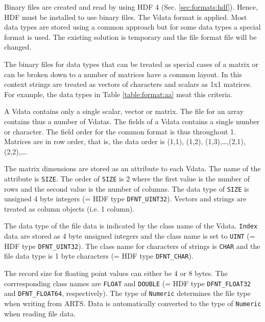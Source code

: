  \label{sec:formats:file:binary}
  
 Binary files are created and read by using HDF 4 (Sec.
 \ref{sec:formats:hdf}). Hence, HDF must be installed to use binary
 files. The Vdata format is applied. Most data types are stored using
 a common approach but for some data types a special format is used.
 The existing solution is temporary and the file format file will be
 changed.


 \label{sec:formats:file:binary:general}
 
 The binary files for data types that can be treated as special cases
 of a matrix or can be broken down to a number of matrices have a
 common layout. In this context strings are treated as vectors of
 characters and scalars as 1x1 matrices. For example, the data types
 in Table \ref{table:format:aa} meat this criteria.
 
 A Vdata contains only a single scalar, vector or matrix. The file for
 an array contains thus a number of Vdatas. The fields of a Vdata
 contains a single number or character. The field order for the common
 format is thus throughout 1. Matrices are in row order, that is, 
 the data order is (1,1), (1,2), (1,3),\dots,(2,1),(2,2),\dots.
 
 The matrix dimensions are stored as an attribute to each Vdata. The
 name of the attribute is \verb|SIZE|. The order of \verb|SIZE| is 2
 where the first value is the number of rows and the second value is
 the number of columns. The data type of \verb|SIZE| is unsigned 4 byte
 integers (= HDF type \verb|DFNT_UINT32|). Vectors and strings are
 treated as column objects (i.e. 1 column).
 
 The data type of the file data is indicated by the class name of the
 Vdata. \verb|Index| data are stored as 4 byte unsigned integers and
 the class name is set to \verb|UINT| (= HDF type \verb|DFNT_UINT32|).
 The class name for characters of strings is \verb|CHAR| and the file
 data type is 1 byte characters (= HDF type \verb|DFNT_CHAR|).

 The record size for floating point values can either be 4 or 8 bytes.
 The corrresponding class names are \verb|FLOAT| and \verb|DOUBLE|
 (= HDF type \verb|DFNT_FLOAT32| and \verb|DFNT_FLOAT64|, respectively).
 The type of \verb|Numeric| determines the file type when writing from
 ARTS. Data is automatically converted to the type of \verb|Numeric|
 when reading file data.
 
